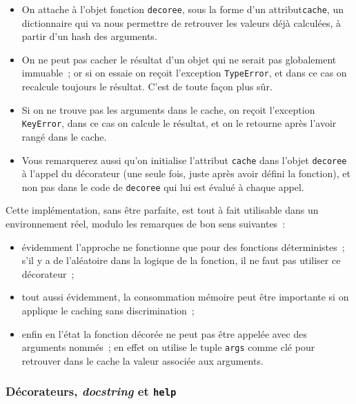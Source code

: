 \begin{itemize}
\tightlist
\item
  On attache à l'objet fonction \texttt{decoree}, sous la forme d'un
  attribut\texttt{cache}, un dictionnaire qui va nous permettre de
  retrouver les valeurs déjà calculées, à partir d'un hash des
  arguments.
\item
  On ne peut pas cacher le résultat d'un objet qui ne serait pas
  globalement immuable~; or si on essaie on reçoit l'exception
  \texttt{TypeError}, et dans ce cas on recalcule toujours le résultat.
  C'est de toute façon plus sûr.
\item
  Si on ne trouve pas les arguments dans le cache, on reçoit l'exception
  \texttt{KeyError}, dans ce cas on calcule le résultat, et on le
  retourne après l'avoir rangé dans le cache.
\item
  Vous remarquerez aussi qu'on initialise l'attribut \texttt{cache} dans
  l'objet \texttt{decoree} à l'appel du décorateur (une seule fois,
  juste après avoir défini la fonction), et non pas dans le code de
  \texttt{decoree} qui lui est évalué à chaque appel.
\end{itemize}

    Cette implémentation, sans être parfaite, est tout à fait utilisable
dans un environnement réel, modulo les remarques de bon sens suivantes~:

\begin{itemize}
\tightlist
\item
  évidemment l'approche ne fonctionne que pour des fonctions
  déterministes~; s'il y a de l'aléatoire dans la logique de la
  fonction, il ne faut pas utiliser ce décorateur~;
\item
  tout aussi évidemment, la consommation mémoire peut être importante si
  on applique le caching sans discrimination~;
\item
  enfin en l'état la fonction décorée ne peut pas être appelée avec des
  arguments nommés~; en effet on utilise le tuple \texttt{args} comme
  clé pour retrouver dans le cache la valeur associée aux arguments.
\end{itemize}

    \hypertarget{duxe9corateurs-docstring-et-help}{%
\subsubsection{\texorpdfstring{Décorateurs, \emph{docstring} et
\texttt{help}}{Décorateurs, docstring et help}}\label{duxe9corateurs-docstring-et-help}}

